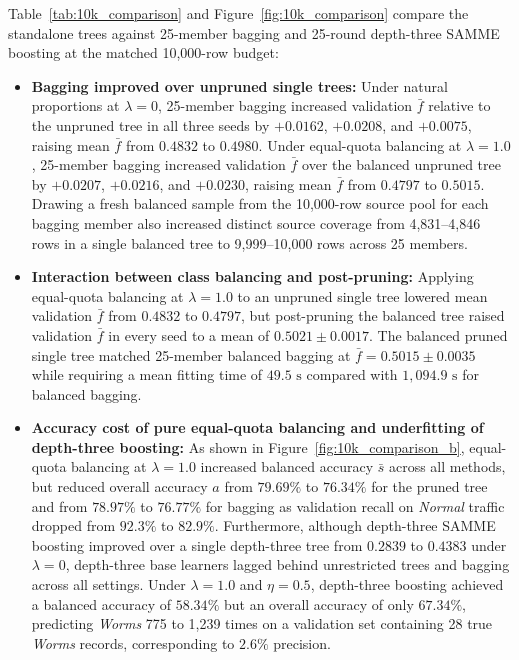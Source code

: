 Table~\ref{tab:10k_comparison} and Figure~\ref{fig:10k_comparison} compare the standalone trees against 25-member bagging and 25-round depth-three SAMME boosting at the matched 10,000-row budget:
\begin{itemize}
    \item \textbf{Bagging improved over unpruned single trees:} Under natural proportions at $\lambda = 0$, 25-member bagging increased validation $\bar{f}$ relative to the unpruned tree in all three seeds by $+0.0162$, $+0.0208$, and $+0.0075$, raising mean $\bar{f}$ from $0.4832$ to $0.4980$. Under equal-quota balancing at $\lambda = 1.0$, 25-member bagging increased validation $\bar{f}$ over the balanced unpruned tree by $+0.0207$, $+0.0216$, and $+0.0230$, raising mean $\bar{f}$ from $0.4797$ to $0.5015$. Drawing a fresh balanced sample from the 10,000-row source pool for each bagging member also increased distinct source coverage from 4,831--4,846 rows in a single balanced tree to 9,999--10,000 rows across 25 members.
    \item \textbf{Interaction between class balancing and post-pruning:} Applying equal-quota balancing at $\lambda = 1.0$ to an unpruned single tree lowered mean validation $\bar{f}$ from $0.4832$ to $0.4797$, but post-pruning the balanced tree raised validation $\bar{f}$ in every seed to a mean of $0.5021 \pm 0.0017$. The balanced pruned single tree matched 25-member balanced bagging at $\bar{f} = 0.5015 \pm 0.0035$ while requiring a mean fitting time of $49.5\text{ s}$ compared with $1{,}094.9\text{ s}$ for balanced bagging.
    \item \textbf{Accuracy cost of pure equal-quota balancing and underfitting of depth-three boosting:} As shown in Figure~\ref{fig:10k_comparison_b}, equal-quota balancing at $\lambda = 1.0$ increased balanced accuracy $\bar{s}$ across all methods, but reduced overall accuracy $a$ from $79.69\%$ to $76.34\%$ for the pruned tree and from $78.97\%$ to $76.77\%$ for bagging as validation recall on \emph{Normal} traffic dropped from $92.3\%$ to $82.9\%$. Furthermore, although depth-three SAMME boosting improved over a single depth-three tree from $0.2839$ to $0.4383$ under $\lambda = 0$, depth-three base learners lagged behind unrestricted trees and bagging across all settings. Under $\lambda = 1.0$ and $\eta = 0.5$, depth-three boosting achieved a balanced accuracy of $58.34\%$ but an overall accuracy of only $67.34\%$, predicting \emph{Worms} 775 to 1,239 times on a validation set containing 28 true \emph{Worms} records, corresponding to $2.6\%$ precision.
\end{itemize}

